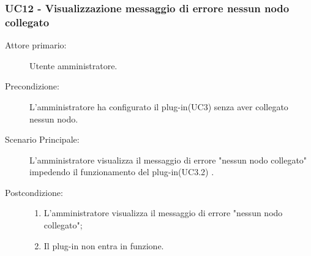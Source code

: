 \subsubsection{UC12 - Visualizzazione messaggio di errore nessun nodo collegato}
\label{sssec:uc12}
\begin{description}
	\item[Attore primario:] Utente amministratore.
	\item[Precondizione:] L'amministratore ha configurato il plug-in(UC3) senza aver collegato nessun nodo.
	\item[Scenario Principale:] L'amministratore visualizza il messaggio di errore "nessun nodo collegato" impedendo il funzionamento del plug-in(UC3.2) .
	\item[Postcondizione:]
	\begin{enumerate}
		\item L'amministratore visualizza il messaggio di errore "nessun nodo collegato";
		\item Il plug-in non entra in funzione.
	\end{enumerate}
\end{description}